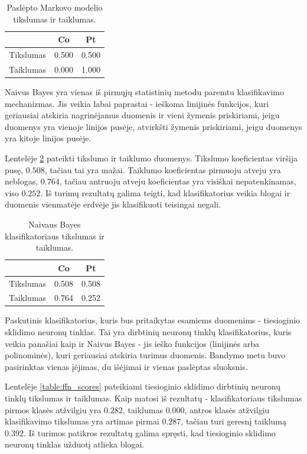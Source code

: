 \documentclass[]{vgtuef}
\begin{document}
\begin{table}[!t]
  \renewcommand{\arraystretch}{1.3}
  \centering
  \caption{Paslėpto Markovo modelio tikslumas ir taiklumas.}
  \label{table:hmm_scores}
  \begin{tabular}{|c|c|c|} \hline
    & Co & Pt \\ \hline
    Tikslumas & 0.500 & 0.500 \\ \hline
    Taiklumas & 0.000 & 1.000 \\ \hline
  \end{tabular}
\end{table}

Naivus Bayes \cite{R22230} yra vienas iš pirmųjų statistinių metodu paremtu klasifikavimo mechanizmas. Jis veikia labai paprastai - ieškoma linijinės funkcijos, kuri geriausiai atskiria nagrinėjamus duomenis ir vieni žymenis priskiriami, jeigu duomenys yra vienoje linijos pusėje, atvirkšti žymenis priskiriami, jeigu duomenys yra kitoje linijos pusėje. 

Lentelėje \ref{table:nb_scores} pateikti tikslumo ir taiklumo duomenys. Tikslumo koeficientas viršija pusę, $0.508$, tačiau tai yra mažai. Taiklumo koeficientas pirmuoju atveju yra neblogas, $0.764$, tačiau antruoju atveju koeficientas yra visiškai nepatenkinamas, viso $0.252$. Iš turimų rezultatų galima teigti, kad klasifikatorius veikia blogai ir duomenis vienmatėje erdvėje jis klasifikuoti teisingai negali.

\begin{table}[!t]
  \centering
  \caption{Naivaus Bayes klasifikatoriaus tikslumas ir taiklumas.}
  \label{table:nb_scores}
  \begin{tabular}{|c|c|c|} \hline
    & Co & Pt \\ \hline
    Tikslumas & 0.508 & 0.508 \\ \hline
    Taiklumas & 0.764 & 0.252 \\ \hline
  \end{tabular}
\end{table}

Paskutinis klasifikatorius, kuris bus pritaikytas esamiems duomenims - tiesioginio sklidimo neuronų tinklas. Tai yra dirbtinių neuronų tinklų klasifikatorius, kuris veikia panašiai kaip ir Naivus Bayes - jis ieško funkcijos (linijinės arba polinominės), kuri geriausiai atskiria turimus duomenis. Bandymo metu buvo pasirinktas vienas įėjimas, du išėjimai ir vienas paslėptas sluoksnis. 

Lentelėje \ref{table:ffn_scores} pateikiami tiesioginio sklidimo dirbtinių neuronų tinklų tikslumas ir taiklumas. Kaip matosi iš rezultatų - klasifikatoriaus tikslumas pirmos klasės atžvilgiu yra $0.282$, taiklumas $0.000$, antros klasės atžvilgiu klasifikavimo tikslumas yra artimas pirmai $0.287$, tačiau turi geresnį taiklumą $0.392$. Iš turimos patikros rezultatų galima spręsti, kad tiesioginio sklidimo neuronų tinklas užduotį atlieka blogai.
\end{document}
